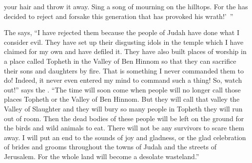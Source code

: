 {your hair
and throw
it away.
Sing
a song of mourning
on
the hilltops.
For
the {}
has decided to reject
and forsake
this generation
that has provoked his wrath!’ ”
\par }{\PP {}The
{}
says,
“I have rejected them because
the people
of Judah
have done
what I consider evil.
They have set up
their disgusting idols
in the temple
which
I have claimed
for my own
and have defiled it.
They have
also built
places of worship
in a place called Topheth
in the Valley
of Ben Hinnom
so that
they can sacrifice
their sons
and daughters
by fire.
That
is something I never commanded
them to do! Indeed, it never
even entered
my mind to command such a thing!
So,
watch
out!” says
the {}. “The time
will soon come
when people will no
longer
call those places Topheth
or the Valley
of Ben Hinnom.
But
they will call that valley
the Valley of Slaughter
and they will bury
so many people in Topheth
they will run
out of room.
Then the dead bodies
of these
people
will be
left on the ground for the birds
and wild
animals
to eat.
There will not
be any
survivors to scare them away.
I will put an end
to the sounds
of joy
and gladness,
or the glad celebration
of brides
and grooms
throughout the towns
of Judah
and the streets
of Jerusalem.
For
the whole land
will become
a desolate wasteland.”

\par }
